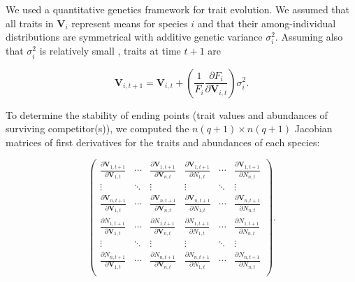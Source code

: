 We used a quantitative genetics framework for trait evolution.
We assumed that all traits in $\mathbf{V}_i$ represent means for species $i$
and that their among-individual distributions are symmetrical with additive
genetic variance $\sigma^2_i$.
Assuming also that $\sigma^2_i$ is relatively small
\citep{Iwasa:1991eo,Abrams:2001va,Abrams:1993cr}, traits at time $t+1$ are

\begin{equation} \label{eq:trait-change}
    \mathbf{V}_{i,t+1} = \mathbf{V}_{i,t} + \left( \frac{1}{F_i}
        \frac{\partial F_i}{\partial \mathbf{V}_{i,t}} \right) \sigma^2_i
    \textrm{.}
\end{equation}

To determine the stability of ending points (trait values and abundances of
surviving competitor(s)), we computed the $n (q+1) \times n (q+1)$ Jacobian matrices
of first derivatives for the traits and abundances of each species:

\begin{equation} \label{eq:jacobian}
    \begin{pmatrix}
        \frac{\partial \mathbf{V}_{1,t+1}}{\partial \mathbf{V}_{1,t}} & \cdots &
            \frac{\partial \mathbf{V}_{1,t+1}}{\partial \mathbf{V}_{n,t}} &
            \frac{\partial \mathbf{V}_{1,t+1}}{\partial N_{1,t}} & \cdots &
            \frac{\partial \mathbf{V}_{1,t+1}}{\partial N_{n,t}} \\
        \vdots & \ddots & \vdots & \vdots & \ddots & \vdots \\
        \frac{\partial \mathbf{V}_{n,t+1}}{\partial \mathbf{V}_{1,t}} & \cdots &
            \frac{\partial \mathbf{V}_{n,t+1}}{\partial \mathbf{V}_{n,t}} &
            \frac{\partial \mathbf{V}_{n,t+1}}{\partial N_{1,t}} & \cdots &
            \frac{\partial \mathbf{V}_{n,t+1}}{\partial N_{n,t}} \\[1ex]
%
%
        \frac{\partial N_{1,t+1}}{\partial \mathbf{V}_{1,t}} & \cdots &
            \frac{\partial N_{1,t+1}}{\partial \mathbf{V}_{n,t}} &
            \frac{\partial N_{1,t+1}}{\partial N_{1,t}} & \cdots &
            \frac{\partial N_{1,t+1}}{\partial N_{n,t}} \\
        \vdots & \ddots & \vdots & \vdots & \ddots & \vdots \\
        \frac{\partial N_{n,t+1}}{\partial \mathbf{V}_{1,t}} & \cdots &
            \frac{\partial N_{n,t+1}}{\partial \mathbf{V}_{n,t}} &
            \frac{\partial N_{n,t+1}}{\partial N_{1,t}} & \cdots &
            \frac{\partial N_{n,t+1}}{\partial N_{n,t}} \\
    \end{pmatrix}
    \text{.}
\end{equation}

